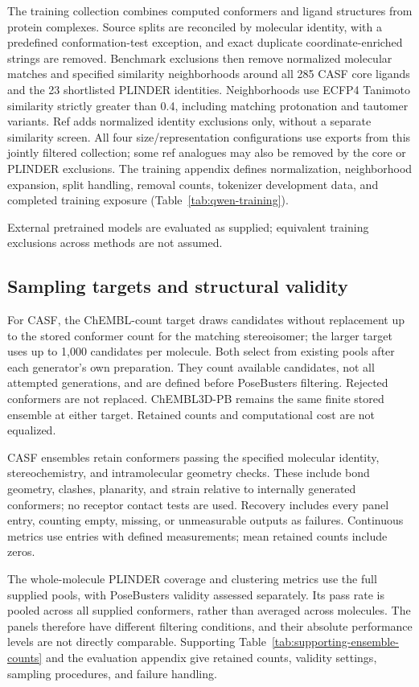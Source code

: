 The training collection combines computed conformers and ligand structures from protein
complexes. Source splits are reconciled by molecular identity, with a predefined
conformation-test exception, and exact duplicate coordinate-enriched strings are removed.
Benchmark exclusions then remove normalized molecular matches and specified similarity
neighborhoods around all 285 CASF core ligands and the 23 shortlisted PLINDER identities.
Neighborhoods use ECFP4 Tanimoto similarity strictly greater than 0.4, including matching
protonation and tautomer variants. Ref adds normalized identity exclusions only, without
a separate similarity screen. All four size/representation configurations use exports from this jointly filtered
collection; some ref analogues may also be removed by the core or PLINDER exclusions.
The training appendix defines normalization, neighborhood expansion, split handling,
removal counts, tokenizer development data, and completed training exposure
(Table~\ref{tab:qwen-training}).

External pretrained models are evaluated as supplied; equivalent training exclusions across methods
are not assumed.

\subsection{Sampling targets and structural validity}

For CASF, the ChEMBL-count target draws candidates without replacement up to the stored
conformer count for the matching stereoisomer; the larger target uses up to 1,000
candidates per molecule. Both select from existing pools after each generator's own
preparation. They count available candidates, not all attempted generations, and are
defined before PoseBusters\cite{buttenschoen2024posebusters} filtering. Rejected conformers
are not replaced. ChEMBL3D-PB remains the same finite stored ensemble at either target.
Retained counts and computational cost are not equalized.

CASF ensembles retain conformers passing the specified molecular identity,
stereochemistry, and intramolecular geometry checks. These include bond geometry,
clashes, planarity, and strain relative to internally generated conformers; no receptor
contact tests are used. Recovery includes every panel entry, counting empty, missing,
or unmeasurable outputs as failures. Continuous metrics use entries with defined
measurements; mean retained counts include zeros.

The whole-molecule PLINDER coverage and clustering metrics use the full supplied
pools, with PoseBusters validity assessed separately. Its pass rate is pooled across
all supplied conformers, rather than averaged across molecules. The panels therefore
have different filtering conditions, and their absolute performance levels are not
directly comparable. Supporting Table~\ref{tab:supporting-ensemble-counts} and the
evaluation appendix give retained counts, validity settings, sampling procedures,
and failure handling.

